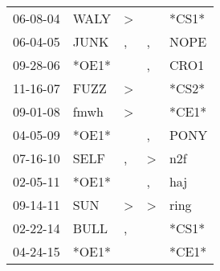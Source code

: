 \begin{supertabular}{lllll}
 06-08-04 &   WALY &  \textgreater &               &  *CS1* \\
 06-04-05 &   JUNK &             , &             , &   NOPE \\
 09-28-06 &  *OE1* &               &             , &   CRO1 \\
 11-16-07 &   FUZZ &  \textgreater &               &  *CS2* \\
 09-01-08 &   fmwh &  \textgreater &               &  *CE1* \\
 04-05-09 &  *OE1* &               &             , &   PONY \\
 07-16-10 &   SELF &             , &  \textgreater &    n2f \\
 02-05-11 &  *OE1* &               &             , &    haj \\
 09-14-11 &    SUN &  \textgreater &  \textgreater &   ring \\
 02-22-14 &   BULL &             , &               &  *CS1* \\
 04-24-15 &  *OE1* &               &               &  *CE1* \\
\end{supertabular}
